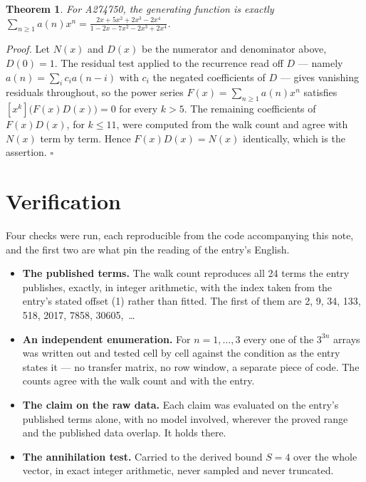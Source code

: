 \documentclass[11pt]{article}
\newtheorem{theorem}{Theorem}
\theoremstyle{definition}
\begin{document}
\begin{theorem} For A274750, the generating function is exactly $\sum_{n\ge 1} a(n)x^n = \frac{2x + 5x^{2} + 2x^{3} - 2x^{4}}{1 - 2x - 7x^{2} - 2x^{3} + 2x^{4}}$.\end{theorem}

{\itshape Proof.} Let $N(x)$ and $D(x)$ be the numerator and denominator above, $D(0)=1$. The residual test applied to the recurrence read off $D$ --- namely $a(n) = \sum_i c_i a(n-i)$ with $c_i$ the negated coefficients of $D$ --- gives vanishing residuals throughout, so the power series $F(x)=\sum_{n\ge 1}a(n)x^n$ satisfies $[x^k]\bigl(F(x)D(x)\bigr) = 0$ for every $k > 5$. The remaining coefficients of $F(x)D(x)$, for $k \le 11$, were computed from the walk count and agree with $N(x)$ term by term. Hence $F(x)D(x) = N(x)$ identically, which is the assertion. $\square$

\section{Verification}

Four checks were run, each reproducible from the code accompanying this note, and the first two are what pin the reading of the entry's English.

\begin{itemize}

\item {\bfseries The published terms.} The walk count reproduces all 24 terms the entry publishes, exactly, in integer arithmetic, with the index taken from the entry's stated offset (1) rather than fitted. The first of them are 2, 9, 34, 133, 518, 2017, 7858, 30605,~\dots

\item {\bfseries An independent enumeration.} For $n = 1,\dots,3$ every one of the $3^{3n}$ arrays was written out and tested cell by cell against the condition as the entry states it --- no transfer matrix, no row window, a separate piece of code. The counts agree with the walk count and with the entry.

\item {\bfseries The claim on the raw data.} Each claim was evaluated on the entry's published terms alone, with no model involved, wherever the proved range and the published data overlap. It holds there.

\item {\bfseries The annihilation test.} Carried to the derived bound $S = 4$ over the whole vector, in exact integer arithmetic, never sampled and never truncated.

\end{itemize}
\end{document}
